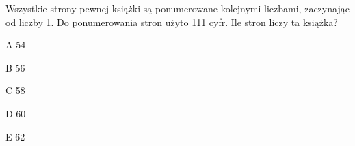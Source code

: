 \begin{tresc}
Wszystkie strony pewnej książki są ponumerowane kolejnymi liczbami, zaczynając od liczby 1. Do ponumerowania stron użyto 111 cyfr. Ile stron liczy ta książka?
\end{tresc}
\begin{wariant}{A} 54 \end{wariant}
\begin{wariant}{B} 56 \end{wariant}
\begin{wariant}{C} 58 \end{wariant}
\begin{wariant}{D} 60 \end{wariant}
\begin{wariant}{E} 62 \end{wariant}
